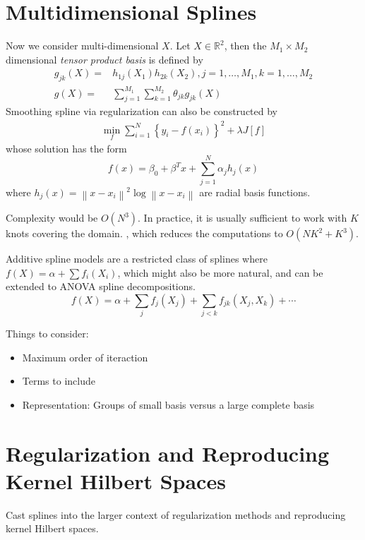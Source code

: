 \section{Multidimensional Splines}
Now we consider multi-dimensional $X$. Let $X\in\mathbb{R}^2$, then the $M_1\times M_2$ dimensional
\textit{tensor product basis} is defined by
\begin{align*}
g_{j k}(X)=&h_{1 j}\left(X_{1}\right) h_{2 k}\left(X_{2}\right), j=1, \ldots, M_{1}, k=1, 
\ldots, M_{2}\\
g(X)=&\sum_{j=1}^{M_{1}} \sum_{k=1}^{M_{2}} \theta_{j k} g_{j k}(X)
\end{align*}
Smoothing spline via regularization can also be constructed by
\begin{align*}
    \min _{f} \sum_{i=1}^{N}\left\{y_{i}-f\left(x_{i}\right)\right\}^{2}+\lambda J[f]
\end{align*}
whose solution has the form
\begin{equation*}
    f(x)=\beta_{0}+\beta^{T} x+\sum_{j=1}^{N} \alpha_{j} h_{j}(x)
\end{equation*}
where $h_{j}(x)=\left\|x-x_{i}\right\|^{2} \log \left\|x-x_{i}\right\|$ are radial basis functions. 

Complexity would be $O(N^3)$. In practice, it is usually sufficient to work with $K$ knots covering
the domain. , which reduces the computations to $O(NK^2+K^3)$. 

Additive spline models are a restricted class of splines where $f(X)=\alpha+\sum f_i(X_i)$, which
might also be more natural, and can be extended to ANOVA spline decompositions. 
\begin{equation*}
    f(X)=\alpha+\sum_{j} f_{j}\left(X_{j}\right)+\sum_{j<k} f_{j k}\left(X_{j}, X_{k}\right)+\cdots
\end{equation*}

Things to consider: 
\begin{itemize}
\item Maximum order of iteraction
\item Terms to include
\item Representation: Groups of small basis versus a large complete basis
\end{itemize}

\section{Regularization and Reproducing Kernel Hilbert Spaces}
Cast splines into the larger context of regularization methods
and reproducing kernel Hilbert spaces. 

